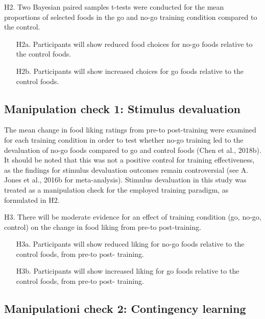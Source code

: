 \documentclass[man,floatsintext]{apa6}
\begin{document}
\noindent H2. Two Bayesian paired samples t-tests were conducted for the mean proportions of selected foods in the go and no-go training condition compared to the control.

\begin{itemize}
\item[H2a.] Participants will show reduced food choices for no-go foods relative to the control foods.
\item[H2b.] Participants will show increased choices for go foods relative to the control foods.
\end{itemize}

\hypertarget{manipulation-check-1-stimulus-devaluation}{%
\subsection{Manipulation check 1: Stimulus devaluation}\label{manipulation-check-1-stimulus-devaluation}}

The mean change in food liking ratings from pre-to post-training were examined for each training condition in order to test whether no-go training led to the devaluation of no-go foods compared to go and control foods (Chen et al., 2018b). It should be noted that this was not a positive control for training effectiveness, as the findings for stimulus devaluation outcomes remain controversial (see A. Jones et al., 2016b for meta-analysis). Stimulus devaluation in this study was treated as a manipulation check for the employed training paradigm, as formulated in H2.

\noindent H3. There will be moderate evidence for an effect of training condition (go, no-go, control) on the change in food liking from pre-to post-training.

\begin{itemize}
\item[H3a.] Participants will show reduced liking for no-go foods relative to the control foods, from pre-to post- training.
\item[H3b.] Participants will show increased liking for go foods relative to the control foods, from pre-to post- training.
\end{itemize}

\hypertarget{manipulationi-check-2-contingency-learning}{%
\subsection{Manipulationi check 2: Contingency learning}\label{manipulationi-check-2-contingency-learning}}
\end{document}
